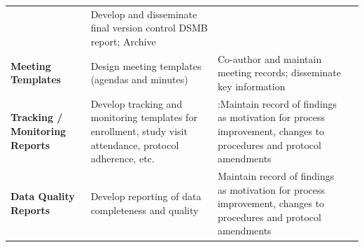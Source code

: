 \documentclass[]{book}
\theoremstyle{definition}
\theoremstyle{definition}
\theoremstyle{definition}
\theoremstyle{remark}
\begin{document}
\begin{longtable}[]{@{}llll@{}}
\begin{minipage}[t]{0.21\columnwidth}
\end{minipage} & \begin{minipage}[t]{0.25\columnwidth}\raggedright\strut
Develop and disseminate final version control DSMB report; Archive\strut
\end{minipage}\tabularnewline
\begin{minipage}[t]{0.19\columnwidth}\raggedright\strut
\textbf{Meeting Templates}\strut
\end{minipage} & \begin{minipage}[t]{0.23\columnwidth}\raggedright\strut
Design meeting templates (agendas and minutes)\strut
\end{minipage} & \begin{minipage}[t]{0.21\columnwidth}\raggedright\strut
Co-author and maintain meeting records; disseminate key
information\strut
\end{minipage} & \begin{minipage}[t]{0.25\columnwidth}\raggedright\strut
\strut
\end{minipage}\tabularnewline
\begin{minipage}[t]{0.19\columnwidth}\raggedright\strut
\textbf{Tracking / Monitoring Reports}\strut
\end{minipage} & \begin{minipage}[t]{0.23\columnwidth}\raggedright\strut
Develop tracking and monitoring templates for enrollment, study visit
attendance, protocol adherence, etc.\strut
\end{minipage} & \begin{minipage}[t]{0.21\columnwidth}\raggedright\strut
:Maintain record of findings as motivation for process improvement,
changes to procedures and protocol amendments\strut
\end{minipage} & \begin{minipage}[t]{0.25\columnwidth}\raggedright\strut
\strut
\end{minipage}\tabularnewline
\begin{minipage}[t]{0.19\columnwidth}\raggedright\strut
\textbf{Data Quality Reports}\strut
\end{minipage} & \begin{minipage}[t]{0.23\columnwidth}\raggedright\strut
Develop reporting of data completeness and quality\strut
\end{minipage} & \begin{minipage}[t]{0.21\columnwidth}\raggedright\strut
Maintain record of findings as motivation for process improvement,
changes to procedures and protocol amendments\strut

\end{minipage}
\end{longtable}
\end{document}
